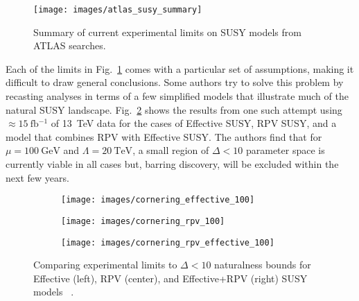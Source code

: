 \documentclass[12pt]{article}
\begin{document}
    \noindent \begin{figure}[htbp] \begin{center}
    \texttt{[image: images/atlas\_susy\_summary]}
    \caption{Summary of current experimental limits on SUSY models from ATLAS searches.}
    \label{atlas_susy_summary}
    \end{center} \end{figure}

    Each of the limits in Fig.~\ref{atlas_susy_summary} comes with a particular set of assumptions, making it difficult to draw general conclusions. Some authors try to solve this problem by recasting analyses in terms of a few simplified models that illustrate much of the natural SUSY landscape. Fig.~\ref{cornering_limits} shows the results from one such attempt using $\approx \SI{15}{\femto\barn^{-1}}$ of \SI{13}{\tera\electronvolt} data for the cases of Effective SUSY, RPV SUSY, and a model that combines RPV with Effective SUSY. The authors find that for $\mu = \SI{100}{\giga\electronvolt}$ and $\Lambda = \SI{20}{\tera\electronvolt}$, a small region of $\Delta < 10$ parameter space is currently viable in all cases but, barring discovery, will be excluded within the next few years.
    
        \noindent \begin{figure}[htbp] \begin{center}
        \begin{subfigure}[htbp]{0.3\textwidth} \begin{center}
        \texttt{[image: images/cornering\_effective\_100]}
        \end{center} \end{subfigure}
        \begin{subfigure}[htbp]{0.3\textwidth} \begin{center}
        \texttt{[image: images/cornering\_rpv\_100]}
        \end{center} \end{subfigure}
        \begin{subfigure}[htbp]{0.3\textwidth} \begin{center}
        \texttt{[image: images/cornering\_rpv\_effective\_100]}
        \end{center} \end{subfigure}
            \caption{Comparing experimental limits to $\Delta < 10$ naturalness bounds for Effective (left), RPV (center), and Effective+RPV (right) SUSY models ~\cite{cornering}.}
        \label{cornering_limits}
        \end{center} \end{figure}
\end{document}

